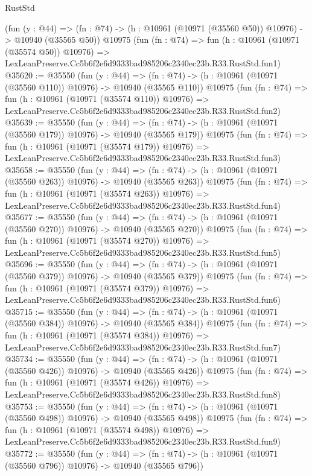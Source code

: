 \begin{lexlean}{RustStd}
\begin{coremodule}
    (fun (y : @44) =>
    (fn : @74) -> (h : @10961 (@10971 (@35560 @50)) @10976) -> @10940 (@35565 @50))
    @10975
    (fun (fn : @74) =>
    fun (h : @10961 (@10971 (@35574 @50)) @10976) =>
    LexLeanPreserve.Cc5b6f2e6d9333bad985206c2340ec23b.R33.RustStd.fun1)
@35620 := @35550
    (fun (y : @44) =>
    (fn : @74) -> (h : @10961 (@10971 (@35560 @110)) @10976) -> @10940 (@35565 @110))
    @10975
    (fun (fn : @74) =>
    fun (h : @10961 (@10971 (@35574 @110)) @10976) =>
    LexLeanPreserve.Cc5b6f2e6d9333bad985206c2340ec23b.R33.RustStd.fun2)
@35639 := @35550
    (fun (y : @44) =>
    (fn : @74) -> (h : @10961 (@10971 (@35560 @179)) @10976) -> @10940 (@35565 @179))
    @10975
    (fun (fn : @74) =>
    fun (h : @10961 (@10971 (@35574 @179)) @10976) =>
    LexLeanPreserve.Cc5b6f2e6d9333bad985206c2340ec23b.R33.RustStd.fun3)
@35658 := @35550
    (fun (y : @44) =>
    (fn : @74) -> (h : @10961 (@10971 (@35560 @263)) @10976) -> @10940 (@35565 @263))
    @10975
    (fun (fn : @74) =>
    fun (h : @10961 (@10971 (@35574 @263)) @10976) =>
    LexLeanPreserve.Cc5b6f2e6d9333bad985206c2340ec23b.R33.RustStd.fun4)
@35677 := @35550
    (fun (y : @44) =>
    (fn : @74) -> (h : @10961 (@10971 (@35560 @270)) @10976) -> @10940 (@35565 @270))
    @10975
    (fun (fn : @74) =>
    fun (h : @10961 (@10971 (@35574 @270)) @10976) =>
    LexLeanPreserve.Cc5b6f2e6d9333bad985206c2340ec23b.R33.RustStd.fun5)
@35696 := @35550
    (fun (y : @44) =>
    (fn : @74) -> (h : @10961 (@10971 (@35560 @379)) @10976) -> @10940 (@35565 @379))
    @10975
    (fun (fn : @74) =>
    fun (h : @10961 (@10971 (@35574 @379)) @10976) =>
    LexLeanPreserve.Cc5b6f2e6d9333bad985206c2340ec23b.R33.RustStd.fun6)
@35715 := @35550
    (fun (y : @44) =>
    (fn : @74) -> (h : @10961 (@10971 (@35560 @384)) @10976) -> @10940 (@35565 @384))
    @10975
    (fun (fn : @74) =>
    fun (h : @10961 (@10971 (@35574 @384)) @10976) =>
    LexLeanPreserve.Cc5b6f2e6d9333bad985206c2340ec23b.R33.RustStd.fun7)
@35734 := @35550
    (fun (y : @44) =>
    (fn : @74) -> (h : @10961 (@10971 (@35560 @426)) @10976) -> @10940 (@35565 @426))
    @10975
    (fun (fn : @74) =>
    fun (h : @10961 (@10971 (@35574 @426)) @10976) =>
    LexLeanPreserve.Cc5b6f2e6d9333bad985206c2340ec23b.R33.RustStd.fun8)
@35753 := @35550
    (fun (y : @44) =>
    (fn : @74) -> (h : @10961 (@10971 (@35560 @498)) @10976) -> @10940 (@35565 @498))
    @10975
    (fun (fn : @74) =>
    fun (h : @10961 (@10971 (@35574 @498)) @10976) =>
    LexLeanPreserve.Cc5b6f2e6d9333bad985206c2340ec23b.R33.RustStd.fun9)
@35772 := @35550
    (fun (y : @44) =>
    (fn : @74) -> (h : @10961 (@10971 (@35560 @796)) @10976) -> @10940 (@35565 @796))

\end{coremodule}
\end{lexlean}
